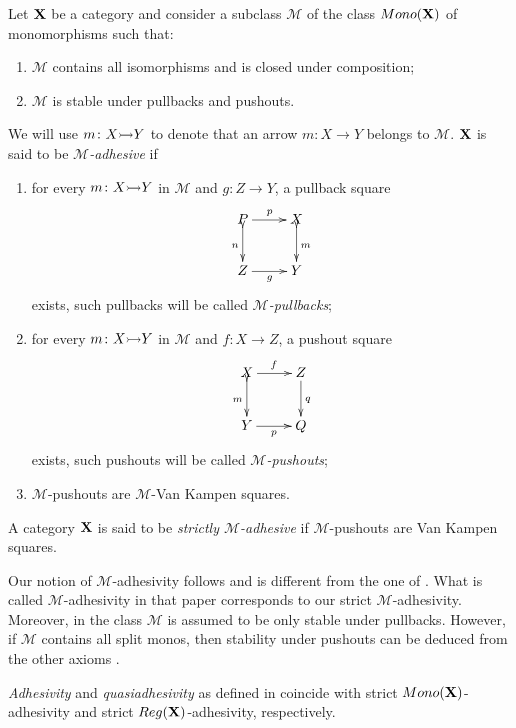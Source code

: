 \documentclass[a4paper,UKenglish,cleveref,pdftex, thm-restate,numberwithinsect]{lipics}
\newcommand{\mon}{\mathsf{Mono}}
\newcommand{\reg}{\mathsf{Reg}}
\newcommand{\mto}[0]{\scalebox{1}{$\rightarrowtail$}}
\def\X{\textbf {\textup{X}}}
\begin{document}
\begin{definition}
	Let $\X$ be a category and consider a subclass $\mathcal{M}$ of the class $\mon(\X)$ of monomorphisms such that:
	\begin{enumerate}
		\item $\mathcal{M}$ contains all isomorphisms and is closed under composition;
		\item $\mathcal{M}$ is stable under pullbacks and pushouts.
	\end{enumerate} 
	We will use $m\colon X\mto Y$ to denote that an arrow $m\colon X\to Y$ belongs to $\mathcal{M}$. $\X$ is said to be \emph{$\mathcal{M}$-adhesive} if
	\begin{enumerate}
		\item for every $m\colon X\mto Y$ in $\mathcal{M}$ and $g\colon Z\to Y$, a pullback square
		\[\xymatrix{P\ar[r]^p \ar@{>->}[d]_{n}& X \ar@{>->}[d]^{m}\\ Z \ar[r]_g& Y}\]
		exists, such pullbacks will be called \emph{$\mathcal{M}$-pullbacks};
		\item for every $m\colon X\mto Y$ in $\mathcal{M}$ and $f\colon X\to Z$, a pushout square
		\[\xymatrix{X \ar[r]^f \ar@{>->}[d]_{m}& Z \ar[d]^{q}\\ Y\ar[r]_p &Q}\]
		exists, such pushouts  will be called \emph{$\mathcal{M}$-pushouts}; 
		\item  $\mathcal{M}$-pushouts are $\mathcal{M}$-Van Kampen squares.
	\end{enumerate}
	
A category $\X$ is said to be \emph{strictly $\mathcal{M}$-adhesive} if $\mathcal{M}$-pushouts are Van Kampen squares.	
\end{definition}

\begin{remark}\label{rem:diff}Our notion of $\mathcal{M}$-adhesivity follows \cite{ehrig2012,ehrig2014adhesive} and is different from the one of \cite{azzi2019essence}. What is called $\mathcal{M}$-adhesivity in that paper corresponds to our strict $\mathcal{M}$-adhesivity. Moreover, in \cite{azzi2019essence} the class $\mathcal{M}$ is assumed to be only stable under pullbacks. However, if $\mathcal{M}$ contains all split monos, then stability under pushouts can be deduced from the other axioms \cite[Prop.~$5.1.21$]{castelnovo2023thesis}.
\end{remark}


\begin{remark}\label{rem:salva} 
	\emph{Adhesivity} and \emph{quasiadhesivity} as defined in \cite{lack2005adhesive,garner2012axioms}  coincide with  strict $\mon(\X) $-adhesivity and strict $\reg(\X)$-adhesivity, respectively. 
\end{remark}
\end{document}
